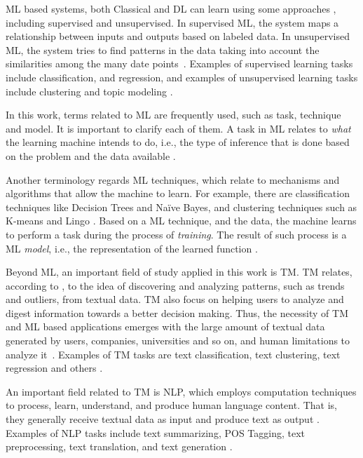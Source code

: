 ML based systems, both Classical and \gls{DL} can learn using some approaches \cite{Schmidhuber2015, Caruana1997}, including supervised and unsupervised. In supervised \gls{ML}, the system maps a relationship between inputs and outputs based on labeled data. In unsupervised ML, the system tries to find patterns in the data taking into account the similarities among the many date points~\cite{Theodoridis2009}.
Examples of supervised learning tasks include classification, and regression, and examples of unsupervised learning tasks include clustering and topic modeling \cite{Kowsari2019, Aggarwal2018, Russell2020}.


In this work, terms related to \gls{ML} are frequently used, such as task, technique and model. It is important to clarify each of them. A task in \gls{ML} relates to \emph{what} the learning machine intends to do, i.e., the type of inference that is done based  on the problem and the data available \cite{Quintanilla2015}. 

Another terminology regards \gls{ML} techniques, which relate to mechanisms and algorithms that allow the machine to learn. For example, there are classification techniques like Decision Trees and Naïve Bayes, and clustering techniques such as K-means and Lingo \cite{Osinski2004, Aggarwal2018}. 
Based on a \gls{ML} technique,  and the data, the machine learns to perform a task during the process of \textit{training}. The result of such process is a \gls{ML} \textit{model}, i.e.,  the representation of the learned function \cite{Quintanilla2015}.


Beyond \gls{ML}, an important field of study applied in this work is \gls{TM}. \gls{TM} relates, according to \textcite{Aggarwal2013},  to the idea of discovering and analyzing patterns, such as trends and outliers, from textual data. TM also focus on helping users to analyze and digest information towards a better decision making. Thus, the necessity of TM and ML based applications emerges with the large amount of textual data  generated by users, companies, universities and so on, and human limitations to analyze it~\cite{Lecun2015, Khan2014}. Examples of \gls{TM} tasks are text classification, text clustering, text regression and others \cite{Aggarwal2018}.

An important field related to \gls{TM} is \gls{NLP}, 
which employs computation techniques to process, learn, understand, and produce human language content. That is, they generally receive textual data as input and produce text as output  \cite{Hirschberg2015}.
Examples of \gls{NLP} tasks include text summarizing, \gls{POS} Tagging, text preprocessing, text translation, and text generation \cite{Gambhir2017, Brown2020}.

